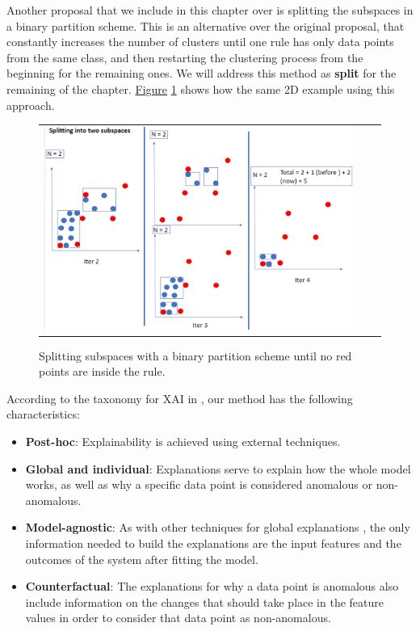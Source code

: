 Another proposal that we include in this chapter over \parencite{nunez2002rule} is splitting the subspaces in a binary partition scheme. This is an alternative over the original proposal, that constantly increases the number of clusters until one rule has only data points from the same class, and then restarting the clustering process from the beginning for the remaining ones. We will address this method as \textbf{split} for the remaining of the chapter. \hyperref[fig:ch4-keep-reset]{Figure} \ref{fig:ch4-keep-reset} shows how the same 2D example using this approach.

\begin{figure}[!h]
\centering
  \begin{tabular}{c@{\qquad}c@{\qquad}c}
\includegraphics[width=0.7\columnwidth]{figures/chapter4_RuleExtraction/keep_reset.png}
  \end{tabular} 
  \caption{Splitting subspaces with a binary partition scheme until no red points are inside the rule. \label{fig:ch4-keep-reset}}
\end{figure}

According to the taxonomy for XAI in \parencite{molnar2019interpretable}, our method has the following characteristics:
\begin{itemize}
    \item \textbf{Post-hoc}: Explainability is achieved using external techniques.
    \item \textbf{Global and individual}: Explanations serve to explain how the whole model works, as well as why a specific data point is considered anomalous or non-anomalous.
    \item \textbf{Model-agnostic}: As with other techniques for global explanations \parencite{molnar2019interpretable}, the only information needed to build the explanations are the input features and the outcomes of the system after fitting the model.
    \item \textbf{Counterfactual}: The explanations for why a data point is anomalous also include information on the changes that should take place in the feature values in order to consider that data point as non-anomalous.
\end{itemize}

